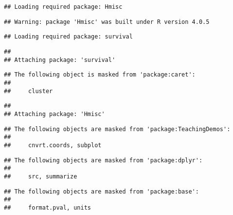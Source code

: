 \documentclass[
]{article}
\begin{document}
\begin{verbatim}
## Loading required package: Hmisc
\end{verbatim}

\begin{verbatim}
## Warning: package 'Hmisc' was built under R version 4.0.5
\end{verbatim}

\begin{verbatim}
## Loading required package: survival
\end{verbatim}

\begin{verbatim}
## 
## Attaching package: 'survival'
\end{verbatim}

\begin{verbatim}
## The following object is masked from 'package:caret':
## 
##     cluster
\end{verbatim}

\begin{verbatim}
## 
## Attaching package: 'Hmisc'
\end{verbatim}

\begin{verbatim}
## The following objects are masked from 'package:TeachingDemos':
## 
##     cnvrt.coords, subplot
\end{verbatim}

\begin{verbatim}
## The following objects are masked from 'package:dplyr':
## 
##     src, summarize
\end{verbatim}

\begin{verbatim}
## The following objects are masked from 'package:base':
## 
##     format.pval, units
\end{verbatim}
\end{document}
